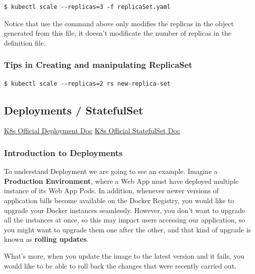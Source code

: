 \documentclass{article}
\newenvironment{blocktemplateIII}[1]{%
    \tcolorbox[beamer,%
    noparskip,breakable,
    ,colframe=Red,%
    colbacklower=LimeGreen!75!LightGreen,%
    title=#1]}%
    {\endtcolorbox}
\newenvironment{codetemplate}[1][]{%
  \mybasecolorbox[#1]
  \itshape
}{%
  \endmybasecolorbox
}
\begin{document}
\begin{blocktemplateIII}{WARNING}
\begin{codetemplate}{}
\begin{verbatim}
$ kubectl scale --replicas=3 -f replicaSet.yaml
\end{verbatim}
\end{codetemplate}
Notice that use the command above only modifies the replicas in the object generated from this file, it doesn't modificate the number of replicas in the definition file.
\end{blocktemplateIII}

\newpage
\subsubsection{Tips in Creating and manipulating ReplicaSet}
\begin{codetemplate}{}
\begin{verbatim}
$ kubectl scale --replicas=2 rs new-replica-set
\end{verbatim}
\end{codetemplate}

\subsection{Deployments / StatefulSet}

\href{https://kubernetes.io/docs/concepts/workloads/controllers/deployment/}{K8s Official Deployment Doc}
\href{https://kubernetes.io/docs/concepts/workloads/controllers/statefulset/}{K8s Official StatefulSet Doc}

\subsubsection{Introduction to Deployments}

To understand Deployment we are going to see an example. Imagine a \textbf{Production Environment}, where a Web App must have deployed multiple instance of its Web App Pods. In addition, whenever newer versions of application bills become available on the Docker Registry, you would like to upgrade your Docker instances seamlessly. However, you don't want to upgrade all the instances at once, so this may impact users accessing our application, so you might want to upgrade them one after the other, and that kind of upgrade is known as \textbf{rolling updates}.

What's more, when you update the image to the latest version and it fails, you would like to be able to roll back the changes that were recently carried out.
\end{document}

